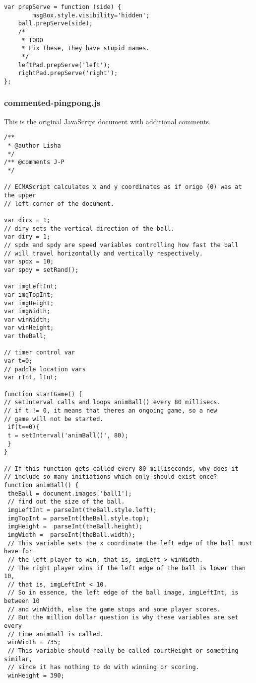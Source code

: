 \documentclass[a4paper,10pt]{article}
\begin{document}
\begin{verbatim}
var prepServe = function (side) {
        msgBox.style.visibility='hidden';
    ball.prepServe(side);
    /* 
     * TODO 
     * Fix these, they have stupid names.
     */
    leftPad.prepServe('left');
    rightPad.prepServe('right');
};
\end{verbatim}

\newpage
\subsubsection{commented-pingpong.js}
This is the original JavaScript document with additional comments.

\begin{verbatim}
/**
 * @author Lisha
 */
/** @comments J-P
 */

// ECMAScript calculates x and y coordinates as if origo (0) was at the upper
// left corner of the document.

var dirx = 1;
// diry sets the vertical direction of the ball.
var diry = 1;
// spdx and spdy are speed variables controlling how fast the ball
// will travel horizontally and vertically respectively.
var spdx = 10;
var spdy = setRand();

var imgLeftInt;
var imgTopInt;
var imgHeight;
var imgWidth;
var winWidth;
var winHeight;
var theBall;

// timer control var
var t=0;
// paddle location vars
var rInt, lInt;

function startGame() {
// setInterval calls and loops animBall() every 80 millisecs.
// if t != 0, it means that theres an ongoing game, so a new
// game will not be started.
 if(t==0){
 t = setInterval('animBall()', 80);
 }
}

// If this function gets called every 80 milliseconds, why does it
// include so many initiations which only should exist once?
function animBall() {
 theBall = document.images['ball1']; 
 // find out the size of the ball.
 imgLeftInt = parseInt(theBall.style.left);
 imgTopInt = parseInt(theBall.style.top);
 imgHeight =  parseInt(theBall.height);
 imgWidth =  parseInt(theBall.width);
 // This variable sets the x coordinate the left edge of the ball must have for
 // the left player to win, that is, imgLeft > winWidth.
 // The right player wins if the left edge of the ball is lower than 10, 
 // that is, imgLeftInt < 10.
 // So in essence, the left edge of the ball image, imgLeftInt, is between 10
 // and winWidth, else the game stops and some player scores.
 // But the million dollar question is why these variables are set every
 // time animBall is called.
 winWidth = 735;
 // This variable should really be called courtHeight or something similar,
 // since it has nothing to do with winning or scoring.
 winHeight = 390;


\end{verbatim}
\end{document}

